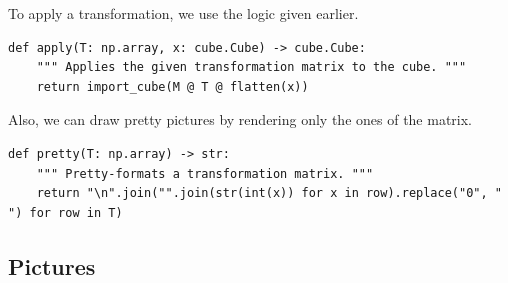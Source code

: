 \documentclass[11pt, oneside]{article}
\theoremstyle{plain}
\begin{document}
To apply a transformation, we use the logic given earlier.
\begin{verbatim}
def apply(T: np.array, x: cube.Cube) -> cube.Cube:
    """ Applies the given transformation matrix to the cube. """
    return import_cube(M @ T @ flatten(x))
\end{verbatim}

Also, we can draw pretty pictures by rendering only the ones of the matrix.
\begin{verbatim}
def pretty(T: np.array) -> str:
    """ Pretty-formats a transformation matrix. """
    return "\n".join("".join(str(int(x)) for x in row).replace("0", " ") for row in T)
\end{verbatim}

\newpage

\subsection{Pictures}
\end{document}
